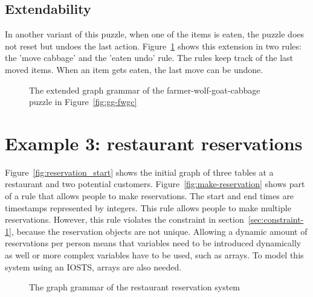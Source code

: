 \subsection{Extendability}
In another variant of this puzzle, when one of the items is eaten, the puzzle does not reset but undoes the last action. Figure~\ref{fig:gg-fwgc-extended} shows this extension in two rules: the 'move cabbage' and the 'eaten undo' rule. The rules keep track of the last moved items. When an item gets eaten, the last move can be undone.

\begin{figure}[ht]
  \begin{center}
    \hspace{20px}
  \end{center}
  \caption{The extended graph grammar of the farmer-wolf-goat-cabbage puzzle in Figure~\ref{fig:gg-fwgc}}
  \label{fig:gg-fwgc-extended}
\end{figure}

\section{Example 3: restaurant reservations}
Figure~\ref{fig:reservation_start} shows the initial graph of three tables at a restaurant and two potential customers. Figure~\ref{fig:make-reservation} shows part of a rule that allows people to make reservations. The start and end times are timestamps represented by integers. This rule allows people to make multiple reservations. However, this rule violates the constraint in section~\ref{sec:constraint-1}, because the reservation objects are not unique. Allowing a dynamic amount of reservations per person means that variables need to be introduced dynamically as well or more complex variables have to be used, such as arrays. To model this system using an IOSTS, arrays are also needed.

\begin{figure}[ht]
  \begin{center}
    \hspace{20px}
  \end{center}
  \caption{The graph grammar of the restaurant reservation system}
  \label{fig:gg-reservation}
\end{figure}


